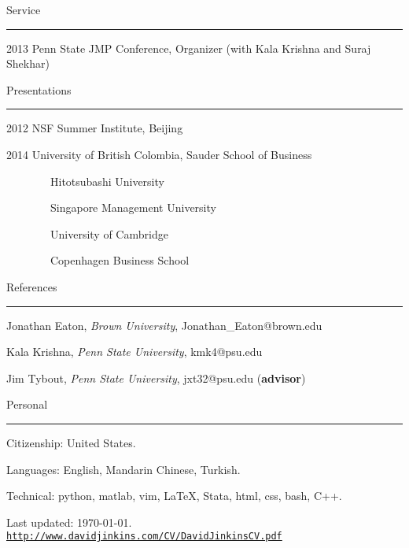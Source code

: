 \documentclass[letterpaper]{article}
\def\footerlink{http://www.davidjinkins.com/CV/DavidJinkinsCV.pdf}
\renewenvironment{itemize}{
    \begin{list}{}{
            \setlength{\leftmargin}{1.5em}
            \setlength{\parskip}{0pt}
            \setlength{\parsep}{0pt}
        }
    }{
    \end{list}
}
\begin{document}
\vspace{4mm}
{\Large Service}
\vspace{1mm}
\hrule
\begin{itemize}
    \item 2013 Penn State JMP Conference, Organizer (with Kala Krishna and Suraj Shekhar)
\end{itemize}

\vspace{4mm}
{\Large Presentations}
\vspace{1mm}
\hrule
\begin{itemize}
    \item 2012 NSF Summer Institute, Beijing
    \item 2014 University of British Colombia, Sauder School of Business
    \item \ \ \ \ \ \ \ \ Hitotsubashi University
    \item \ \ \ \ \ \ \ \ Singapore Management University 
    \item \ \ \ \ \ \ \ \ University of Cambridge
    \item \ \ \ \ \ \ \ \ Copenhagen Business School 
\end{itemize}

\vspace{4mm}
{\Large References}
\vspace{1mm}
\hrule
\begin{itemize}
    \item Jonathan Eaton, \emph{Brown University}, Jonathan\_Eaton@brown.edu
    \item Kala Krishna, \emph{Penn State University}, kmk4@psu.edu
    \item Jim Tybout, \emph{Penn State University}, jxt32@psu.edu (\textbf{advisor})
\end{itemize}

\vspace{7mm}
{\Large Personal}
\vspace{1mm}
\hrule

\begin{itemize}
    \item Citizenship: United States.
    \item Languages: English, Mandarin Chinese, Turkish.
    \item Technical: python, matlab, vim, \LaTeX, Stata, html, css, bash, C++.
\end{itemize}

\begin{center}
    \begin{footnotesize}
        Last updated: \today .\\
        \href{\footerlink}{\texttt{\footerlink}}
    \end{footnotesize}
\end{center}
\end{document}
